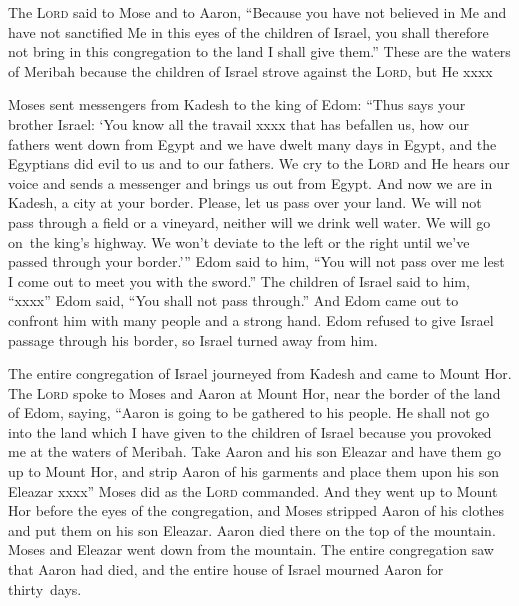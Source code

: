 \begin{inparaenum}
     The \textsc{Lord} said to Mose and to Aaron, ``Because you have not believed in Me and have not sanctified Me in this eyes of the children of Israel, you shall therefore not bring in this congregation to the land I shall give them.''%
     These are the waters of Meribah because the children of Israel strove against the \textsc{Lord}, but He xxxx%
    
     Moses sent messengers from Kadesh to the king of Edom: ``Thus says your brother Israel: `You know all the travail xxxx that has befallen us,%
     how our fathers went down from Egypt and we have dwelt many days in Egypt, and the Egyptians did evil to us and to our fathers.%
     We cry to the \textsc{Lord} and He hears our voice and sends a messenger and brings us out from Egypt. And now we are in Kadesh, a city at your border.%
     Please, let us pass over your land. We will not pass through a field or a vineyard, neither will we drink well water. We will go on\understood\ the king's highway. We won't deviate to the left or the right until we've passed through your border.'\thinspace''%
     Edom said to him, ``You will not pass over me lest I come out to meet you with the sword.''%
     The children of Israel said to him, ``xxxx''%
     Edom said, ``You shall not pass through.'' And Edom came out to confront him with many people and a strong hand.%
     Edom refused to give Israel passage through his border, so Israel turned away from him.%
    
     The entire congregation of Israel journeyed from Kadesh and came to Mount Hor.%
     The \textsc{Lord} spoke to Moses and Aaron at Mount Hor, near the border of the land of Edom, saying,%
     ``Aaron is going to be gathered to his people. He shall not go into the land which I have given to the children of Israel because you provoked me at the waters of Meribah.%
     Take Aaron and his son Eleazar and have them go up to Mount Hor,%
     and strip Aaron of his garments and place them upon his son Eleazar xxxx''%
     Moses did as the \textsc{Lord} commanded. And they went up to Mount Hor before the eyes of the congregation,%
     and Moses stripped Aaron of his clothes and put them on his son Eleazar. Aaron died there on the top of the mountain. Moses and Eleazar went down from the mountain.%
     The entire congregation saw that Aaron had died, and the entire house of Israel mourned Aaron for thirty~days.%
\end{inparaenum}
